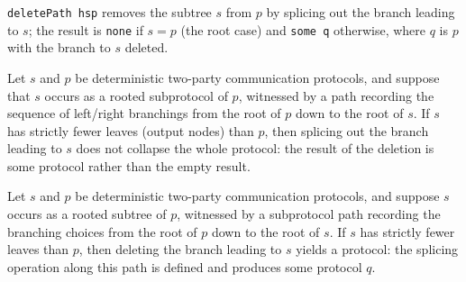 \begin{definition}
\label{CommunicationComplexity.Deterministic.Protocol.deletePath}
\leanok
{}
\texttt{deletePath hsp} removes the subtree $s$ from $p$ by splicing out the branch leading to
$s$; the result is \texttt{none} if $s = p$ (the root case) and \texttt{some q} otherwise, where
$q$ is $p$ with the branch to $s$ deleted.
\end{definition}

\begin{lemma}
\label{CommunicationComplexity.Deterministic.Protocol.deletePath_ne_none_of_lt}
\leanok
{}
Let $s$ and $p$ be deterministic two-party communication protocols, and suppose that $s$
occurs as a rooted subprotocol of $p$, witnessed by a path recording the sequence of
left/right branchings from the root of $p$ down to the root of $s$. If $s$ has strictly
fewer leaves (output nodes) than $p$, then splicing out the branch leading to $s$ does
not collapse the whole protocol: the result of the deletion is some protocol rather than
the empty result.
\end{lemma}

\begin{lemma}
\label{CommunicationComplexity.Deterministic.Protocol.deletePath_exists_of_lt}
\leanok
{}
Let $s$ and $p$ be deterministic two-party communication protocols, and suppose $s$
occurs as a rooted subtree of $p$, witnessed by a subprotocol path recording the
branching choices from the root of $p$ down to the root of $s$. If $s$ has strictly
fewer leaves than $p$, then deleting the branch leading to $s$ yields a protocol: the
splicing operation along this path is defined and produces some protocol $q$.
\end{lemma}

